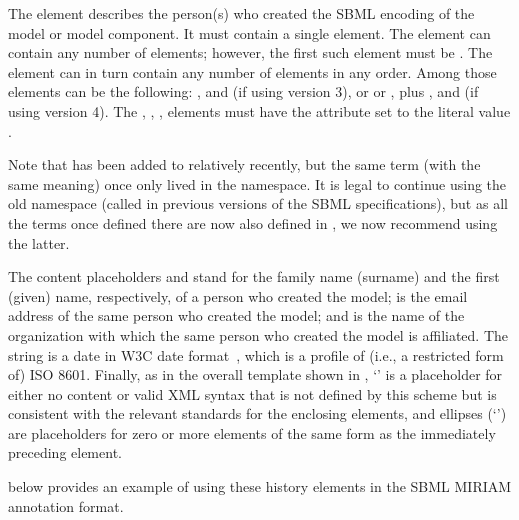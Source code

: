 The  element describes the person(s) who created
the SBML encoding of the model or model component.  It must
contain a single  element.  The 
element can contain any number of elements; however, the first
such element must be .  The  element
can in turn contain any number of elements in any order.  Among
those elements can be the following: ,
 and  (if using  version 3), or  or , plus , and  (if using  version 4).
The , , ,   
elements
must have the attribute  set to the literal
value .

\begin{blockChanged}
Note that  has been added to  relatively recently, but the same term (with the same meaning) once only lived in the  namespace.  It is legal to continue using the old namespace (called  in previous versions of the SBML specifications), but as all the terms once defined there are now also defined in , we now recommend using the latter.
\end{blockChanged}

The content placeholders \familyName and \givenName stand for the
family name (surname) and the first (given) name, respectively, of
a person who created the model;   \emailAddress is the email address
of the same person who created the model; and \orgName is the name
of the organization with which the same person who created the
model is affiliated.  The string \historyDate is a date in W3C
date format~\citep{wolf:1998}, which is a profile of (i.e., a
restricted form of) ISO 8601.  Finally, as in the overall template
shown in , `\otherContent' is
a placeholder for either no content or valid XML syntax that is
not defined by this scheme but is consistent with the relevant
standards for the enclosing elements, and ellipses
(`\moreOfTheSame') are placeholders for zero or more elements of
the same form as the immediately preceding element.

 below provides an example of
using these history elements in the SBML MIRIAM annotation format.


